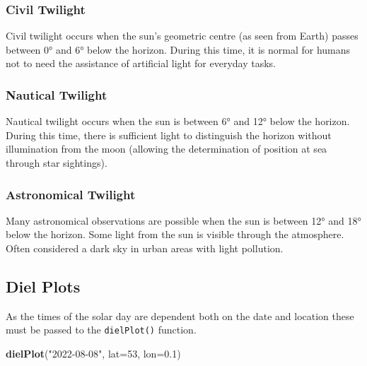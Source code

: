 \documentclass[
]{book}
\newenvironment{Shaded}{\begin{snugshade}}{\end{snugshade}}
\newcommand{\AttributeTok}[1]{\textcolor[rgb]{0.13,0.29,0.53}{#1}}
\newcommand{\DecValTok}[1]{\textcolor[rgb]{0.00,0.00,0.81}{#1}}
\newcommand{\FloatTok}[1]{\textcolor[rgb]{0.00,0.00,0.81}{#1}}
\newcommand{\FunctionTok}[1]{\textcolor[rgb]{0.13,0.29,0.53}{\textbf{#1}}}
\newcommand{\NormalTok}[1]{#1}
\newcommand{\StringTok}[1]{\textcolor[rgb]{0.31,0.60,0.02}{#1}}
\begin{document}
\hypertarget{civil-twilight}{%
\subsubsection{Civil Twilight}\label{civil-twilight}}

Civil twilight occurs when the sun's geometric centre (as seen from Earth) passes between 0° and 6° below the horizon. During this time, it is normal for humans not to need the assistance of artificial light for everyday tasks.

\hypertarget{nautical-twilight}{%
\subsubsection{Nautical Twilight}\label{nautical-twilight}}

Nautical twilight occurs when the sun is between 6° and 12° below the horizon. During this time, there is sufficient light to distinguish the horizon without illumination from the moon (allowing the determination of position at sea through star sightings).

\hypertarget{astronomical-twilight}{%
\subsubsection{Astronomical Twilight}\label{astronomical-twilight}}

Many astronomical observations are possible when the sun is between 12° and 18° below the horizon. Some light from the sun is visible through the atmosphere. Often considered a dark sky in urban areas with light pollution.

\hypertarget{diel-plots}{%
\subsection{Diel Plots}\label{diel-plots}}

As the times of the solar day are dependent both on the date and location these must be passed to the \texttt{dielPlot()} function.

\begin{Shaded}
\begin{Highlighting}[]
\FunctionTok{dielPlot}\NormalTok{(}\StringTok{"2022{-}08{-}08"}\NormalTok{, }\AttributeTok{lat=}\DecValTok{53}\NormalTok{, }\AttributeTok{lon=}\FloatTok{0.1}\NormalTok{)}
\end{Highlighting}
\end{Shaded}
\end{document}
